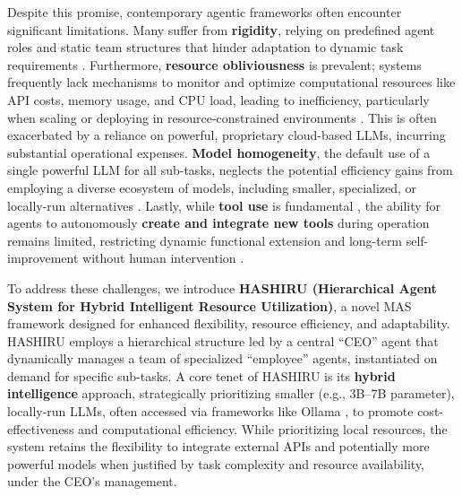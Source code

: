 \documentclass[conference]{IEEEtran}
\begin{document}
Despite this promise, contemporary agentic frameworks often encounter significant limitations. Many suffer from \textbf{rigidity}, relying on predefined agent roles and static team structures that hinder adaptation to dynamic task requirements \cite{zhang2023building}. Furthermore, \textbf{resource obliviousness} is prevalent; systems frequently lack mechanisms to monitor and optimize computational resources like API costs, memory usage, and CPU load, leading to inefficiency, particularly when scaling or deploying in resource-constrained environments \cite{park2023generative}. This is often exacerbated by a reliance on powerful, proprietary cloud-based LLMs, incurring substantial operational expenses. \textbf{Model homogeneity}, the default use of a single powerful LLM for all sub-tasks, neglects the potential efficiency gains from employing a diverse ecosystem of models, including smaller, specialized, or locally-run alternatives \cite{zhou2023agents}. Lastly, while \textbf{tool use} is fundamental \cite{yao2022react, parisi2022talm}, the ability for agents to autonomously \textbf{create and integrate new tools} during operation remains limited, restricting dynamic functional extension and long-term self-improvement without human intervention \cite{wang2023voyager}.

To address these challenges, we introduce \textbf{HASHIRU (Hierarchical Agent System for Hybrid Intelligent Resource Utilization)}, a novel MAS framework designed for enhanced flexibility, resource efficiency, and adaptability. HASHIRU employs a hierarchical structure led by a central ``CEO'' agent that dynamically manages a team of specialized ``employee'' agents, instantiated on demand for specific sub-tasks. A core tenet of HASHIRU is its \textbf{hybrid intelligence} approach, strategically prioritizing smaller (e.g., 3B--7B parameter), locally-run LLMs, often accessed via frameworks like Ollama \cite{ollama}, to promote cost-effectiveness and computational efficiency. While prioritizing local resources, the system retains the flexibility to integrate external APIs and potentially more powerful models when justified by task complexity and resource availability, under the CEO's management.
\end{document}
